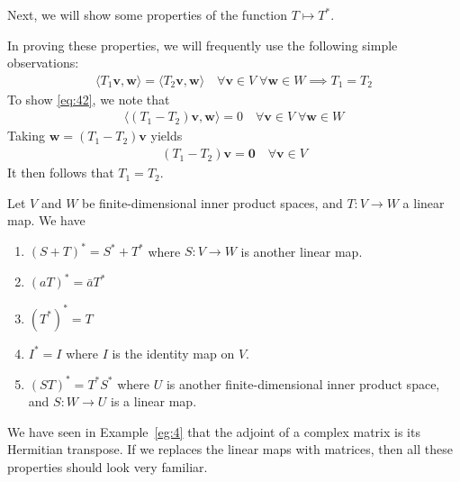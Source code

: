 \documentclass[thmcnt=section, color=blue, 12pt]{my-elegantbook}
\begin{document}

Next, we will show some properties
of the function $T \mapsto T^\ast$.
\begin{note}
	In proving these properties, we will frequently use 
	the following simple observations:
	\begin{align}
		\langle T_1 \mathbf{v}, \mathbf{w} \rangle
		= \langle T_2 \mathbf{v}, \mathbf{w} \rangle
		\quad \forall \mathbf{v} \in V \; \forall \mathbf{w} \in W
		\implies
		T_1 = T_2
		\label{eq:42}
	\end{align}
	To show \eqref{eq:42}, we note that 
	\begin{align*}
		\langle (T_1 - T_2) \mathbf{v}, \mathbf{w} \rangle
		= 0 
		\quad \forall \mathbf{v} \in V \; \forall \mathbf{w} \in W
	\end{align*}
	Taking $\mathbf{w} = (T_1 - T_2)\mathbf{v}$ yields
	\begin{align*}
		(T_1 - T_2)\mathbf{v} = \mathbf{0}
	\quad \forall \mathbf{v} \in V
	\end{align*}
	It then follows that $T_1 = T_2$.
\end{note}

\begin{proposition} \label{pro:6}
	Let $V$ and $W$ be finite-dimensional inner product spaces,
	and $T : V \to W$ a linear map.
	We have 
	\begin{enumerate}
		\item $(S + T)^\ast = S^\ast + T^\ast$
			where $S: V \to W$ is another linear map.
		\item $(a T)^\ast = \bar{a} T^\ast$
		\item $(T^\ast)^\ast = T$
		\item $I^\ast = I$
			where $I$ is the identity map on $V$.
		\item $(S T)^\ast = T^\ast S^\ast$
			where $U$ is another finite-dimensional 
			inner product space, 
			and $S: W \to U$ is a linear map.
	\end{enumerate}
\end{proposition}

\begin{note}
	We have seen in Example~\ref{eg:4} that
	the adjoint of a complex matrix is
	its Hermitian transpose.
	If we replaces the linear maps with matrices,
	then all these properties should look very familiar. 
\end{note}
\end{document}
